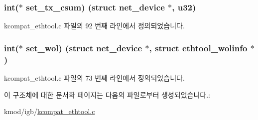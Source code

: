 \subsubsection[{\texorpdfstring{set\+\_\+tx\+\_\+csum}{set_tx_csum}}]{\setlength{\rightskip}{0pt plus 5cm}int($\ast$ set\+\_\+tx\+\_\+csum) (struct net\+\_\+device $\ast$, {\bf u32})}\hypertarget{struct__kc__ethtool__ops_a6083971e2f5e3a37161264d7732e4bb2}{}\label{struct__kc__ethtool__ops_a6083971e2f5e3a37161264d7732e4bb2}


kcompat\+\_\+ethtool.\+c 파일의 92 번째 라인에서 정의되었습니다.

\subsubsection[{\texorpdfstring{set\+\_\+wol}{set_wol}}]{\setlength{\rightskip}{0pt plus 5cm}int($\ast$ set\+\_\+wol) (struct net\+\_\+device $\ast$, struct {\bf ethtool\+\_\+wolinfo} $\ast$)}\hypertarget{struct__kc__ethtool__ops_ad9feedd39d9667395d31fec850c47485}{}\label{struct__kc__ethtool__ops_ad9feedd39d9667395d31fec850c47485}


kcompat\+\_\+ethtool.\+c 파일의 73 번째 라인에서 정의되었습니다.



이 구조체에 대한 문서화 페이지는 다음의 파일로부터 생성되었습니다.\+:\begin{DoxyCompactItemize}
\item 
kmod/igb/\hyperlink{kcompat__ethtool_8c}{kcompat\+\_\+ethtool.\+c}\end{DoxyCompactItemize}

